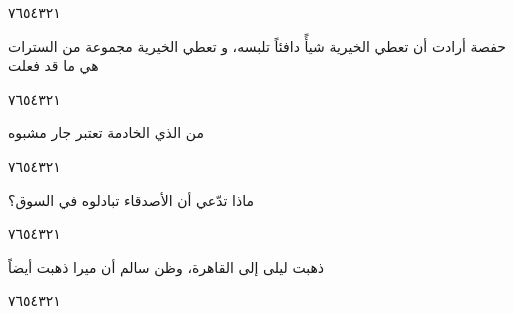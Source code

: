 \documentclass[11pt, a4paper]{article}
\begin{document}
{\begin{center}
        \hfill\textarabic{٧}\hfill\textarabic{٦}\hfill\textarabic{٥}\hfill\textarabic{٤}\hfill\textarabic{٣}\hfill\textarabic{٢}\hfill\textarabic{١}
        \end{center}


\vspace{0.5\baselineskip}\begin{flushright}
\textarabic{حفصة أرادت أن تعطي الخيرية شيأً دافئاً تلبسه، و تعطي الخيرية مجموعة من السترات هي ما قد فعلت}
\end{flushright}

\begin{center}
        \hfill\textarabic{٧}\hfill\textarabic{٦}\hfill\textarabic{٥}\hfill\textarabic{٤}\hfill\textarabic{٣}\hfill\textarabic{٢}\hfill\textarabic{١}
        \end{center}


\vspace{0.5\baselineskip}\begin{flushright}
\textarabic{من الذي الخادمة تعتبر جار مشبوه}
\end{flushright}

\begin{center}
        \hfill\textarabic{٧}\hfill\textarabic{٦}\hfill\textarabic{٥}\hfill\textarabic{٤}\hfill\textarabic{٣}\hfill\textarabic{٢}\hfill\textarabic{١}
        \end{center}


\vspace{0.5\baselineskip}\begin{flushright}
\textarabic{ماذا تدّعي أن الأصدقاء تبادلوه في السوق؟}
\end{flushright}

\begin{center}
        \hfill\textarabic{٧}\hfill\textarabic{٦}\hfill\textarabic{٥}\hfill\textarabic{٤}\hfill\textarabic{٣}\hfill\textarabic{٢}\hfill\textarabic{١}
        \end{center}


\vspace{0.5\baselineskip}\begin{flushright}
\textarabic{ذهبت ليلى إلى القاهرة، وظن سالم أن ميرا ذهبت أيضاً}
\end{flushright}

\begin{center}
        \hfill\textarabic{٧}\hfill\textarabic{٦}\hfill\textarabic{٥}\hfill\textarabic{٤}\hfill\textarabic{٣}\hfill\textarabic{٢}\hfill\textarabic{١}
        \end{center}


}
\end{document}
